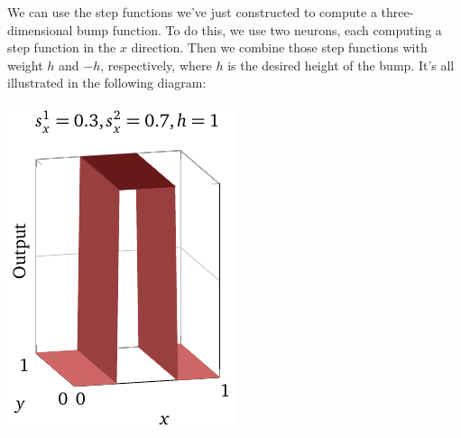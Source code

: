 \documentclass[a4paper,twoside,10pt]{book}
\begin{document}
We can use the step functions we've just constructed to compute a three-dimensional bump function. To do this, we use two neurons, each computing a step function in the $x$ direction. Then we combine those step functions with weight $h$ and $-h$, respectively, where $h$ is the desired height of the bump. It's all illustrated in the following diagram:
\begin{center}
	\includegraphics[width=0.32\linewidth]{./figures/ch4/3d/bumpx1}

\end{center}
\end{document}
